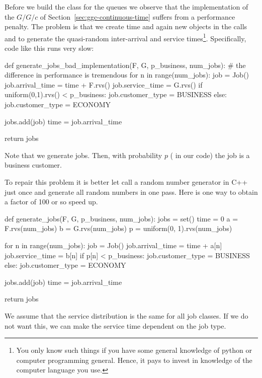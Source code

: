 Before we build the class for the queues we observe that the implementation of the $G/G/c$ of Section~\ref{sec:ggc-continuous-time} suffers from a performance penalty. The problem is that  we create  time and again  new objects in the calls  and   to generate the quasi-random inter-arrival and service times\footnote{You only know such things if you have some general knowledge of python or computer programming general. Hence, it pays to invest in knowledge of the computer language you use.}. Specifically,  code like this runs very slow:
\begin{pyverbatim}
def generate_jobs_bad_implementation(F, G, p_business, num_jobs):
    # the difference in performance is tremendous
    for n in range(num_jobs):
        job = Job()
        job.arrival_time = time + F.rvs()  
        job.service_time = G.rvs()  
        if uniform(0,1).rvs() < p_business:
            job.customer_type = BUSINESS
        else:
            job.customer_type = ECONOMY

        jobs.add(job)
        time = job.arrival_time

    return jobs
\end{pyverbatim}
Note that we generate  jobs. Then, with probability $p$ ( in our code) the job is a business customer. 

To repair this problem it is better let  call a random number generator in C++ just once and generate all random numbers in one pass.
Here is one way to obtain a factor of 100 or so speed up.
\begin{pyverbatim}
def generate_jobs(F, G, p_business, num_jobs):
    jobs = set()
    time = 0
    a = F.rvs(num_jobs)
    b = G.rvs(num_jobs)
    p = uniform(0, 1).rvs(num_jobs)

    for n in range(num_jobs):
        job = Job()
        job.arrival_time = time + a[n]
        job.service_time = b[n]
        if p[n] <  p_business:
            job.customer_type = BUSINESS
        else:
            job.customer_type = ECONOMY

        jobs.add(job)
        time = job.arrival_time

    return jobs
\end{pyverbatim}

We assume that the service distribution is the same for all job classes. If we do not want this, we can make the service time dependent on the job type. 

